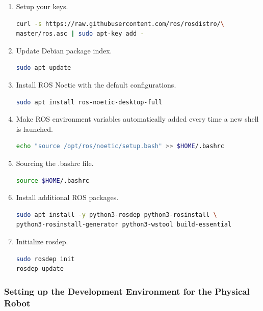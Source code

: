 \documentclass{CSSRforAfrica}
\begin{document}
{{\begin{enumerate}
\item Setup your keys.
\begin{lstlisting}[style=withoutNumbering, language=bash]
curl -s https://raw.githubusercontent.com/ros/rosdistro/\
master/ros.asc | sudo apt-key add -     
\end{lstlisting}           

\item Update Debian package index.
\begin{lstlisting}[style=withoutNumbering, language=bash]
sudo apt update    
\end{lstlisting}

\item Install ROS Noetic with the default configurations.

\begin{lstlisting}[style=withoutNumbering, language=bash]
sudo apt install ros-noetic-desktop-full
\end{lstlisting}
          
\item Make ROS environment variables automatically added every time a new shell is launched.
\begin{lstlisting}[style=withoutNumbering, language=bash]
echo "source /opt/ros/noetic/setup.bash" >> $HOME/.bashrc
\end{lstlisting}

\item Sourcing the .bashrc file.
\begin{lstlisting}[style=withoutNumbering, language=bash]
source $HOME/.bashrc
\end{lstlisting}

\item Install additional ROS packages.
\begin{lstlisting}[style=withoutNumbering, language=bash]
sudo apt install -y python3-rosdep python3-rosinstall \
python3-rosinstall-generator python3-wstool build-essential
\end{lstlisting}

\item Initialize rosdep.
\begin{lstlisting}[style=withoutNumbering, language=bash]
sudo rosdep init
rosdep update
\end{lstlisting}
\end{enumerate}
}
\subsubsection{Setting up the Development Environment for the Physical Robot}
\label{phyrob}
}
\end{document}
